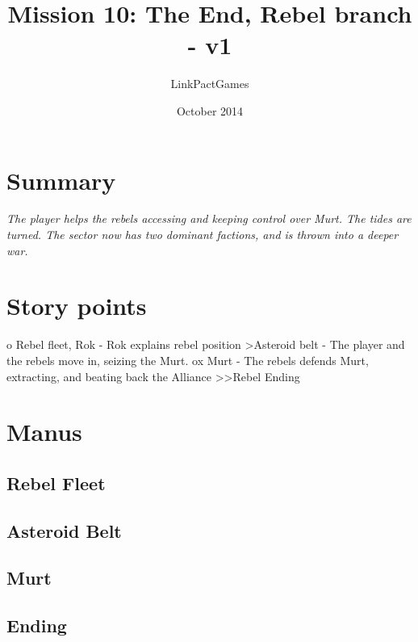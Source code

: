 \documentclass[a4paper,12pt]{article}
\begin{document}
\title{Mission 10: The End, Rebel branch - v1}
\author{LinkPactGames}
\date{October 2014}
\maketitle

\section{Summary}

\textit{The player helps the rebels accessing and keeping control over Murt. The tides are turned.
The sector now has two dominant factions, and is thrown into a deeper war.}

\section{Story points}

o Rebel fleet, Rok - Rok explains rebel position
\textgreater Asteroid belt - The player and the rebels move in, seizing the Murt.
ox Murt - The rebels defends Murt, extracting, and beating back the Alliance
\textgreater \textgreater Rebel Ending

\section{Manus}

\subsection{Rebel Fleet}

\subsection{Asteroid Belt}

\subsection{Murt}

\subsection{Ending}
\end{document}
